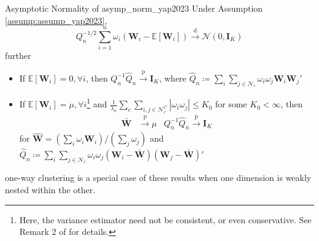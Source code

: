 \documentclass[twoside]{article}
\begin{document}
\begin{theorem}{Asymptotic Normality of \citet{yap2023general}}{asymp_norm_yap2023}
    Under Assumption \ref{assump:assump_yap2023}, $$Q_n^{-1/2} \sum^n_{i=1} \omega_i \left(\mathbf{W}_i-\mathbb{E}\left[\mathbf{W}_i\right]\right) \xrightarrow{\mathrm{d}} \mathcal{N}\left(0,\mathbf{I}_K\right) $$ further 
    \begin{itemize}
        \item If $\mathbb{E}\left[\mathbf{W}_i\right] = 0,\forall i$, then $Q_n^{-1}\hat{Q}_n\xrightarrow{\mathrm{p}} \mathbf{I}_K$, where $\hat{Q}_n\coloneq \sum_i\sum_{j\in\mathcal{N}_i}\omega_i\omega_j \mathbf{W}_i \mathbf{W}_j'$
        \item If $\mathbb{E}\left[\mathbf{W}_i\right] = \mu, \forall i$\footnote{Here, the variance estimator need not be consistent, or even conservative. See Remark 2 of \citet{yap2023general} for details.} and $\frac{1}{\lambda_n} \sum_c\sum_{i,j\in\mathcal{N}^C_c}\left\vert \omega_i\omega_j \right\vert \leq K_0$ for some $K_0<\infty$, then
        \begin{align*}
            \bar{\mathbf{W}}&\xrightarrow{\mathrm{p}}\mu & Q_n^{-1}\hat{Q}_n\xrightarrow{\mathrm{p}}\mathbf{I}_K
        \end{align*}
        for $\hat{\mathbf{W}} = \left(\sum_i \omega_i \mathbf{W}_i\right)/\left(\sum_j\omega_j\right)$ and $\hat{Q}_n\coloneq \sum_i\sum_{j\in\mathcal{N}_i}\omega_i\omega_j \left(\mathbf{W}_i-\bar{\mathbf{W}}\right) \left(\mathbf{W}_j-\bar{\mathbf{W}}\right)'$
    \end{itemize}
    one-way clustering is a special case of these results when one dimension is weakly nested within the other.
\end{theorem}
\end{document}

